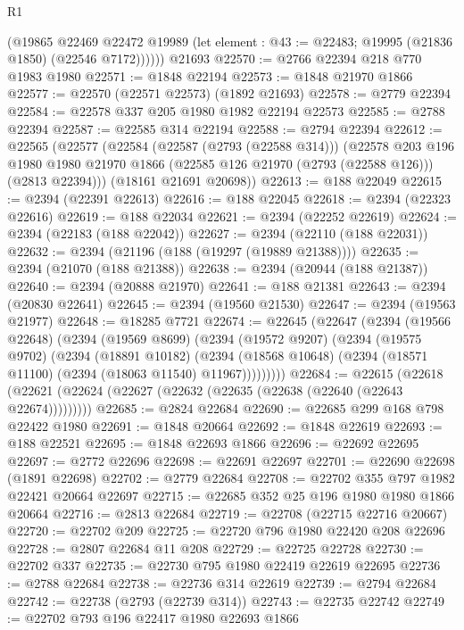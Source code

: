 \begin{lexlean}{R1}
\begin{coremodule}
          (@19865
            @22469
            @22472
            @19989
            (let element : @43 := @22483; @19995 (@21836 @1850) (@22546 @7172))))))
    @21693
@22570 := @2766 @22394 @218 @770 @1983 @1980
@22571 := @1848 @22194
@22573 := @1848 @21970 @1866
@22577 := @22570 (@22571 @22573) (@1892 @21693)
@22578 := @2779 @22394
@22584 := @22578 @337 @205 @1980 @1982 @22194 @22573
@22585 := @2788 @22394
@22587 := @22585 @314 @22194
@22588 := @2794 @22394
@22612 := @22565
    (@22577
      (@22584
        (@22587 (@2793 (@22588 @314)))
        (@22578
          @203
          @196
          @1980
          @1980
          @21970
          @1866
          (@22585 @126 @21970 (@2793 (@22588 @126)))
          (@2813 @22394)))
      (@18161 @21691 @20698))
@22613 := @188 @22049
@22615 := @2394 (@22391 @22613)
@22616 := @188 @22045
@22618 := @2394 (@22323 @22616)
@22619 := @188 @22034
@22621 := @2394 (@22252 @22619)
@22624 := @2394 (@22183 (@188 @22042))
@22627 := @2394 (@22110 (@188 @22031))
@22632 := @2394 (@21196 (@188 (@19297 (@19889 @21388))))
@22635 := @2394 (@21070 (@188 @21388))
@22638 := @2394 (@20944 (@188 @21387))
@22640 := @2394 (@20888 @21970)
@22641 := @188 @21381
@22643 := @2394 (@20830 @22641)
@22645 := @2394 (@19560 @21530)
@22647 := @2394 (@19563 @21977)
@22648 := @18285 @7721
@22674 := @22645
    (@22647
      (@2394
        (@19566 @22648)
        (@2394
          (@19569 @8699)
          (@2394
            (@19572 @9207)
            (@2394
              (@19575 @9702)
              (@2394
                (@18891 @10182)
                (@2394 (@18568 @10648) (@2394 (@18571 @11100) (@2394 (@18063 @11540) @11967)))))))))
@22684 := @22615
    (@22618 (@22621 (@22624 (@22627 (@22632 (@22635 (@22638 (@22640 (@22643 @22674)))))))))
@22685 := @2824 @22684
@22690 := @22685 @299 @168 @798 @22422 @1980
@22691 := @1848 @20664
@22692 := @1848 @22619
@22693 := @188 @22521
@22695 := @1848 @22693 @1866
@22696 := @22692 @22695
@22697 := @2772 @22696
@22698 := @22691 @22697
@22701 := @22690 @22698 (@1891 @22698)
@22702 := @2779 @22684
@22708 := @22702 @355 @797 @1982 @22421 @20664 @22697
@22715 := @22685 @352 @25 @196 @1980 @1980 @1866 @20664
@22716 := @2813 @22684
@22719 := @22708 (@22715 @22716 @20667)
@22720 := @22702 @209
@22725 := @22720 @796 @1980 @22420 @208 @22696
@22728 := @2807 @22684 @11 @208
@22729 := @22725 @22728
@22730 := @22702 @337
@22735 := @22730 @795 @1980 @22419 @22619 @22695
@22736 := @2788 @22684
@22738 := @22736 @314 @22619
@22739 := @2794 @22684
@22742 := @22738 (@2793 (@22739 @314))
@22743 := @22735 @22742
@22749 := @22702 @793 @196 @22417 @1980 @22693 @1866

\end{coremodule}
\end{lexlean}

